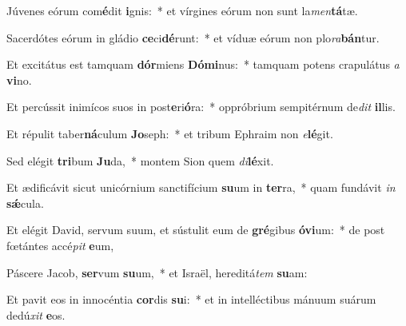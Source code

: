 \item Júvenes eórum com\textbf{é}dit \textbf{i}gnis:~* et vírgines eórum non sunt la\textit{men}\textbf{tá}tæ.
\item Sacerdótes eórum in gládio \textbf{ce}ci\textbf{dé}runt:~* et víduæ eórum non plo\textit{ra}\textbf{bán}tur.
\item Et excitátus est tamquam \textbf{dór}miens \textbf{Dó}\textbf{mi}nus:~* tamquam potens crapulátus \textit{a} \textbf{vi}no.
\item Et percússit inimícos suos in post\textbf{e}ri\textbf{ó}ra:~* oppróbrium sempitérnum de\textit{dit} \textbf{il}lis.
\item Et répulit taber\textbf{ná}culum \textbf{Jo}seph:~* et tribum Ephraim non \textit{e}\textbf{lé}git.
\item Sed elégit \textbf{tri}bum \textbf{Ju}da,~* montem Sion quem \textit{di}\textbf{lé}xit.
\item Et ædificávit sicut unicórnium sanctifícium \textbf{su}um in \textbf{ter}ra,~* quam fundávit \textit{in} \textbf{sǽ}cula.
\item Et elégit David, servum suum, et sústulit eum de \textbf{gré}gibus \textbf{ó}\textbf{vi}um:~* de post fœtántes accé\textit{pit} \textbf{e}um,
\item Páscere Jacob, \textbf{ser}vum \textbf{su}um,~* et Israël, hereditá\textit{tem} \textbf{su}am:
\item Et pavit eos in innocéntia \textbf{cor}dis \textbf{su}i:~* et in intelléctibus mánuum suárum dedú\textit{xit} \textbf{e}os.
